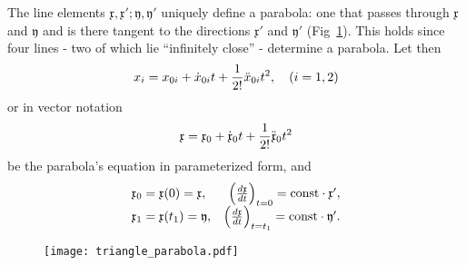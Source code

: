 \documentclass[11pt]{book} \usepackage{amssymb}
\newcommand{\myvec}[1]{\mathfrak{#1}}
\newcommand{\vecx}{\myvec{x}}
\newcommand{\vecy}{\myvec{y}}
\newcommand{\vecderiv}[1]{\dot{\myvec{#1}}}
\newcommand{\vecderivv}[1]{\ddot{\myvec{#1}}}
\begin{document}
The line elements $\vecx,\vecx';\vecy,\vecy'$ uniquely define
a parabola: one that passes through  $\vecx$ and $\vecy$ and is there
tangent to the directions $\vecx'$ and $\vecy'$ 
(Fig~\ref{fig:triangle_parabola}). This holds since four lines - two of
which lie ``infinitely close'' - determine a parabola. Let then
\begin{equation}
  \label{eq:parabola_def1}
  x_i=x_{0i}+\dot{x}_{0i}t+{1\over 2!}\ddot{x}_{0i}t^2, \quad(i=1,2)
\end{equation}
or in vector notation
\begin{equation}
  \label{eq:parabola_def2}
  \vecx=\vecx_0+\vecderiv{x}_0t+{1\over 2!}\vecderivv{x}_0t^2
\end{equation}
be the parabola's equation in parameterized form, and
\begin{equation}
  \label{eq:parabola_initial_def}
  \begin{array}{lrcl}
    \vecx_0=\vecx(0)=\vecx,& \left({d\vecx\over dt}\right)_{t=0}=\mbox{const}\cdot \vecx',\\
    \vecx_1=\vecx(t_1)=\vecy,& \left({d\vecx\over dt}\right)_{t=t_1}=\mbox{const}\cdot \vecy'.\\
  \end{array}  
\end{equation}

\begin{figure}[htp]
  \centering
  \texttt{[image: triangle\_parabola.pdf]}
  \caption{}
  \label{fig:triangle_parabola}
\end{figure}
\end{document}
